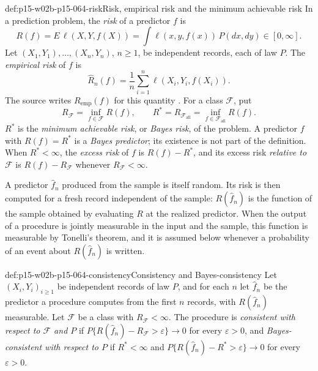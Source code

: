 \begin{hbdefinition}{def:p15-w02b-p15-064-risk}{Risk, empirical risk and the minimum achievable risk}
In a prediction problem, the \emph{risk} of a predictor \(f\) is
\[
 R(f)=E\,\ell(X,Y,f(X))=\int\ell(x,y,f(x))\,P(dx,dy)\in[0,\infty].
\]
Let \((X_1,Y_1),\ldots,(X_n,Y_n)\), \(n\geq1\), be independent records,
each of law \(P\). The \emph{empirical risk} of \(f\) is
\[
 \widehat R_n(f)=\frac1n\sum_{i=1}^n\ell(X_i,Y_i,f(X_i)).
\]
The source writes \(R_{\mathrm{emp}}(f)\) for this quantity
\cite[Section~2.3, p.~5]{LuxburgScholkopf2008Author}.
For a class \(\mathcal F\), put
\[
 R_{\mathcal F}=\inf_{f\in\mathcal F}R(f),\qquad
 R^{*}=R_{\mathcal F_{\mathrm{all}}}=\inf_{f\in\mathcal F_{\mathrm{all}}}R(f).
\]
\(R^{*}\) is the \emph{minimum achievable risk}, or \emph{Bayes risk}, of the
problem. A predictor \(f\) with \(R(f)=R^{*}\) is a \emph{Bayes predictor};
its existence is not part of the definition. When \(R^{*}<\infty\), the
\emph{excess risk} of \(f\) is \(R(f)-R^{*}\), and its excess risk
\emph{relative to \(\mathcal F\)} is \(R(f)-R_{\mathcal F}\) whenever
\(R_{\mathcal F}<\infty\).
\end{hbdefinition}

A predictor \(\widehat f_n\) produced from the sample is itself random.
Its risk is then computed for a fresh record independent of the sample:
\(R(\widehat f_n)\) is the function of the sample obtained by evaluating
\(R\) at the realized predictor. When the output of a procedure is jointly
measurable in the input and the sample, this function is measurable by
Tonelli's theorem, and it is assumed below whenever a probability of an
event about \(R(\widehat f_n)\) is written.

\begin{hbdefinition}{def:p15-w02b-p15-064-consistency}{Consistency and Bayes-consistency}
Let \((X_i,Y_i)_{i\geq1}\) be independent records of law \(P\), and for each
\(n\) let \(\widehat f_n\) be the predictor a procedure computes from the
first \(n\) records, with \(R(\widehat f_n)\) measurable. Let
\(\mathcal F\) be a class with \(R_{\mathcal F}<\infty\). The procedure is
\emph{consistent with respect to \(\mathcal F\) and \(P\)} if
\(P\{R(\widehat f_n)-R_{\mathcal F}>\varepsilon\}\to0\) for every
\(\varepsilon>0\), and \emph{Bayes-consistent with respect to \(P\)} if
\(R^{*}<\infty\) and \(P\{R(\widehat f_n)-R^{*}>\varepsilon\}\to0\) for every
\(\varepsilon>0\).
\end{hbdefinition}

